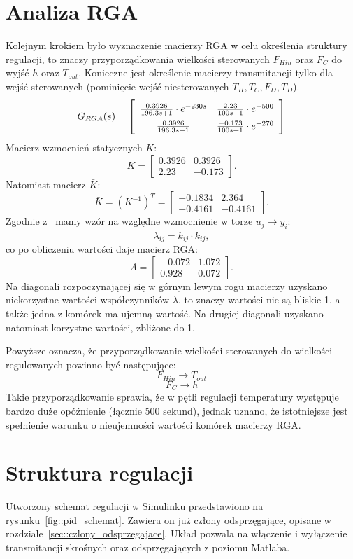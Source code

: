 \documentclass{article}
\begin{document}
\section{Analiza RGA}
Kolejnym krokiem było wyznaczenie macierzy RGA w celu określenia struktury regulacji, to znaczy przyporządkowania wielkości sterowanych $F_{Hin}$ oraz $F_C$ do wyjść $h$ oraz $T_{out}$.
Konieczne jest określenie macierzy transmitancji tylko dla wejść sterowanych (pominięcie wejść niesterowanych $T_H, T_C, F_D, T_D$).
\[
G_{RGA}(s) = \left[
\arraycolsep=5pt\def\arraystretch{1.5}
\begin{array}{cc}
\frac{0.3926}{196.3s+1}\cdot e^{-230s} & \frac{2.23}{100s+1}\cdot e^{-500} \\
\frac{0.3926}{196.3s+1} & \frac{-0.173}{100s+1}\cdot e^{-270} \\
\end{array}
\right]
\]
Macierz wzmocnień statycznych $K$:
\[
K = \left[
\begin{array}{cc}
0.3926 & 0.3926\\
2.23 & -0.173
\end{array}
\right].
\]
Natomiast macierz $\bar{K}$:
\[
\bar{K} = (K^{-1})^T = \left[
\begin{array}{cc}
-0.1834 & 2.364\\
-0.4161 & -0.4161
\end{array}
\right].
\]
Zgodnie z~\cite{regulacja_wielopetlowa} mamy wzór na względne wzmocnienie w torze $u_j \rightarrow y_i$:
\[
\lambda_{ij} = k_{ij} \cdot \bar{k_{ij}},
\]
co po obliczeniu wartości daje macierz RGA:
\[
\Lambda = \left[
\begin{array}{cc}
-0.072 & 1.072\\
0.928 & 0.072
\end{array}
\right].
\]
Na diagonali rozpoczynającej się w górnym lewym rogu macierzy uzyskano niekorzystne wartości współczynników $\lambda$, to znaczy wartości nie są bliskie 1, a także jedna z komórek ma ujemną wartość. Na drugiej diagonali uzyskano natomiast korzystne wartości, zbliżone do 1.

Powyższe oznacza, że przyporządkowanie wielkości sterowanych do wielkości regulowanych powinno być następujące:
\[
F_{Hin} \rightarrow T_{out}
\]
\[
F_C \rightarrow h
\]
Takie przyporządkowanie sprawia, że w pętli regulacji temperatury występuje bardzo duże opóźnienie (łącznie 500 sekund), jednak uznano, że istotniejsze jest spełnienie warunku o nieujemności wartości komórek macierzy RGA.

\section{Struktura regulacji}
Utworzony schemat regulacji w Simulinku przedstawiono na rysunku~\ref{fig::pid_schemat}. Zawiera on już człony odsprzęgające, opisane w rozdziale~\ref{sec::czlony_odsprzegajace}. Układ pozwala na włączenie i wyłączenie transmitancji skrośnych oraz odsprzęgających z poziomu Matlaba.
\end{document}

